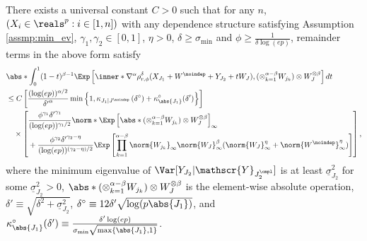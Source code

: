 \documentclass[aos]{imsart}
\begin{document}
\begin{appendix}
\begin{lemma} \label{thm:generalized_remainder_lemma}
There exists a universal constant $C > 0$ such that for any $n$, $(X_i \in \reals^p: i \in [1,n])$ with any dependence structure satisfying Assumption \eqref{assmp:min_ev},
$\gamma_1, \gamma_2 \in [0,1]$, $\eta > 0$, $\delta \geq \sigma_{\min}$ and $\phi \geq \frac{1}{\delta\log(ep)}$, remainder terms in the above form satisfy
\begin{equation*}
\begin{aligned}
    & \abs*{ \int_0^1 (1-t)^{\beta-1} \Exp\left[
        \inner*{\nabla^\alpha \rho_{r,\phi}^\delta(X_{J_1} + W^\noindep + Y_{J_2} + t W_J), (\otimes_{k=1}^{\alpha-\beta} W_{j_k}) \otimes W_J^{\otimes \beta}} 
    \right] dt } \\
    & \leq C \left[
        \frac{(\log(ep))^{\alpha/2}}{{\delta'}^{\alpha}}
        \min\left\{1, \kappa_{J_1|J^\noindep}\left(\delta^\circ\right) + \kappa^\circ_{\abs{J_1}}(\delta') \right\}
    \right] \\
    & \quad \times \left[ \begin{aligned}
        & \frac{\phi^{\gamma_1} {\delta'}^{\gamma_1}}{(\log(ep))^{\gamma_1/2} } 
        \norm*{\Exp\left[
            \abs*{(\otimes_{k=1}^{\alpha-\beta} W_{j_k}) \otimes W_J^{\otimes \beta}}
        \right]}_\infty \\
        & + \frac{\phi^{\gamma_2} {\delta'}^{\gamma_2-\eta}}{(\log(ep))^{(\gamma_2-\eta)/2}} 
        \Exp\left[ 
            \prod_{k=1}^{\alpha-\beta} \norm{W_{j_k}}_\infty \norm{W_J}_\infty^{\beta}
            (\norm{W_J}_\infty^{\eta} + \norm{W^\noindep}_\infty^{\eta}) 
        \right]
    \end{aligned} \right],
\end{aligned}
\end{equation*}
where the minimum eigenvalue of $\Var[Y_{J_2} | \mathscr{Y}_{J_2^\cmpl}]$ is at least $\underline{\sigma}_{J_2}^2$ for some $\underline{\sigma}^2_{J_2} > 0$, $\abs*{(\otimes_{k=1}^{\alpha-\beta} W_{j_k}) \otimes W_J^{\otimes \beta}}$ is the element-wise absolute operation, $\delta' \equiv \sqrt{\delta^2 + \underline{\sigma}_{J_2}^2}$, $\delta^\circ \equiv 12 \delta' \sqrt{\log(p\abs{J_1})}$, and $\kappa^\circ_{\abs{J_1}}(\delta') \equiv \frac{\delta' \log(ep)}{\sigma_{\min} \sqrt{\max\{\abs{J_1}, 1\}}}$.
\end{lemma}


\end{appendix}
\end{document}
